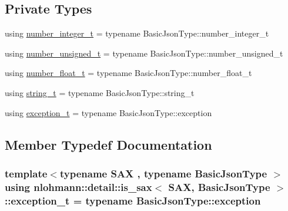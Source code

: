 \subsection*{Private Types}
\begin{DoxyCompactItemize}
\item 
using \hyperlink{structnlohmann_1_1detail_1_1is__sax_aa9a29390ca9810cee149510f586f5573}{number\+\_\+integer\+\_\+t} = typename Basic\+Json\+Type\+::number\+\_\+integer\+\_\+t
\item 
using \hyperlink{structnlohmann_1_1detail_1_1is__sax_a655c9b8038e51e5b9211e2419118644d}{number\+\_\+unsigned\+\_\+t} = typename Basic\+Json\+Type\+::number\+\_\+unsigned\+\_\+t
\item 
using \hyperlink{structnlohmann_1_1detail_1_1is__sax_a58d3205c8d3c7a01cc330374fa7976c5}{number\+\_\+float\+\_\+t} = typename Basic\+Json\+Type\+::number\+\_\+float\+\_\+t
\item 
using \hyperlink{structnlohmann_1_1detail_1_1is__sax_ad8e2e1427ff43536370b6db6ab83ae50}{string\+\_\+t} = typename Basic\+Json\+Type\+::string\+\_\+t
\item 
using \hyperlink{structnlohmann_1_1detail_1_1is__sax_a6efa516f35d544cc8ce9a954f849fed1}{exception\+\_\+t} = typename Basic\+Json\+Type\+::exception
\end{DoxyCompactItemize}


\subsection{Member Typedef Documentation}
\subsubsection[{\texorpdfstring{exception\+\_\+t}{exception_t}}]{\setlength{\rightskip}{0pt plus 5cm}template$<$typename S\+AX , typename Basic\+Json\+Type $>$ using {\bf nlohmann\+::detail\+::is\+\_\+sax}$<$ S\+AX, Basic\+Json\+Type $>$\+::{\bf exception\+\_\+t} =  typename Basic\+Json\+Type\+::exception\hspace{0.3cm}{\ttfamily [private]}}\hypertarget{structnlohmann_1_1detail_1_1is__sax_a6efa516f35d544cc8ce9a954f849fed1}{}\label{structnlohmann_1_1detail_1_1is__sax_a6efa516f35d544cc8ce9a954f849fed1}
